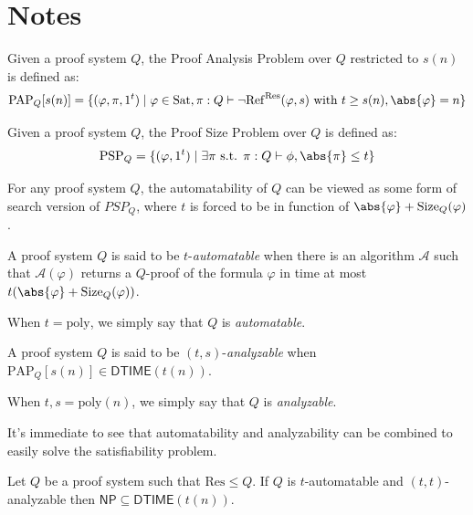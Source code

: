 \chapter{Notes} \label{chap:notes}


    \begin{definition}
        Given a proof system $Q$, the Proof Analysis Problem over $Q$ restricted to $s(n)$ is defined as:
        \[\mathrm{PAP}_Q[s(n)] = \{(\varphi, \pi, 1^t) \mid \varphi \in \mathrm{Sat}, \pi : Q \vdash \lnot \mathrm{Ref}^\mathrm{Res}(\varphi, s) \text{ with } t \geq s(n), \abs{\varphi} = n\}\]
    \end{definition}

    \begin{definition}
        Given a proof system $Q$, the Proof Size Problem over $Q$ is defined as:
        \[\mathrm{PSP}_Q = \{(\varphi, 1^t) \mid \exists \pi \text{ s.t. } \pi : Q \vdash \phi, \abs{\pi} \leq t\}\]
    \end{definition}

    For any proof system $Q$, the automatability of $Q$ can be viewed as some form of search version of $PSP_Q$, where $t$ is forced to be in function of $\abs{\varphi} + \mathrm{Size}_Q(\varphi)$.
    

    \begin{definition}[Automatability]
        A proof system $Q$ is said to be $t$-\textit{automatable} when there is an algorithm $\mathcal{A}$ such that $\mathcal{A}(\varphi)$ returns a $Q$-proof of the formula $\varphi$ in time at most $t(\abs{\varphi} + \mathrm{Size}_Q(\varphi))$.
    \end{definition}

    When $t = \mathrm{poly}$, we simply say that $Q$ is \textit{automatable}.


    \begin{definition}[Analyzability]
        A proof system $Q$ is said to be $(t,s)$-\textit{analyzable} when $\mathrm{PAP}_Q[s(n)] \in \mathsf{DTIME}(t(n))$.
    \end{definition}

    When $t,s = \mathrm{poly}(n)$, we simply say that $Q$ is \textit{analyzable}.


    It's immediate to see that automatability and analyzability can be combined to easily solve the satisfiability problem.

    \begin{proposition}
        Let $Q$ be a proof system such that $\mathrm{Res} \leq Q$. If $Q$ is $t$-automatable and $(t,t)$-analyzable then $\mathsf{NP} \subseteq \mathsf{DTIME}(t(n))$.
    \end{proposition}

